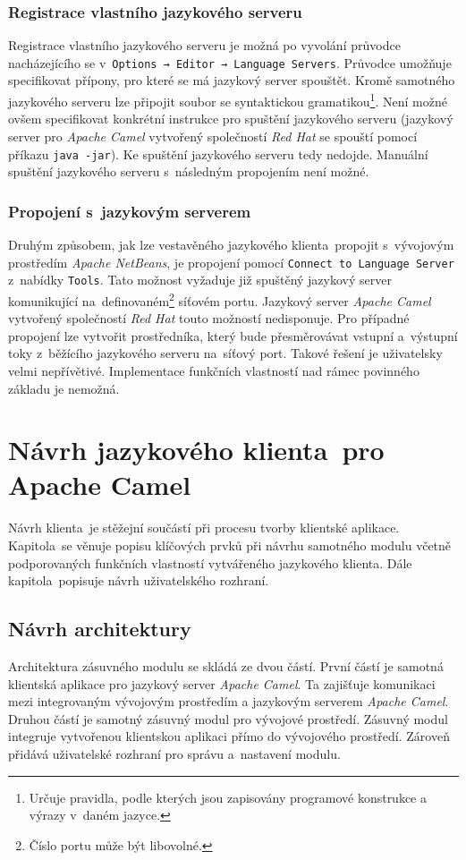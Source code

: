 \subsection{Registrace vlastního jazykového serveru}
Registrace vlastního jazykového serveru je možná po vyvolání průvodce nacházejícího se v~\texttt{Options → Editor → Language Servers}. Průvodce umožňuje specifikovat přípony, pro které se má jazykový server spouštět. Kromě samotného jazykového serveru lze připojit soubor se syntaktickou gramatikou\footnote{Určuje pravidla, podle kterých jsou zapisovány programové konstrukce a výrazy v~daném jazyce.}. Není možné ovšem specifikovat konkrétní instrukce pro spuštění jazykového serveru (jazykový server pro \emph{Apache Camel} vytvořený společností \emph{Red Hat} se spouští pomocí příkazu \texttt{java -jar}). Ke spuštění jazykového serveru tedy nedojde. Manuální spuštění jazykového serveru s~následným propojením není možné.

\subsection{Propojení s~jazykovým serverem}
Druhým způsobem, jak lze vestavěného jazykového klienta~propojit s~vývojovým prostředím \emph{Apache NetBeans}, je propojení pomocí \texttt{Connect to Language Server} z~nabídky \texttt{Tools}. Tato možnost vyžaduje již spuštěný jazykový server komunikující na~definovaném\footnote{Číslo portu může být libovolné.} síťovém portu. Jazykový server \emph{Apache Camel} vytvořený společností \emph{Red Hat} touto možností nedisponuje. Pro případné propojení lze vytvořit prostředníka, který bude přesměrovávat vstupní a~výstupní toky z~běžícího jazykového serveru na~síťový port. Takové řešení je uživatelsky velmi nepřívětivé. Implementace funkčních vlastností nad rámec povinného základu je nemožná. 

\chapter{Návrh jazykového klienta~pro Apache Camel}
\label{navrhJazykovehoKlienta}
Návrh klienta~je stěžejní součástí při procesu tvorby klientské aplikace. Kapitola~se věnuje popisu klíčových prvků při návrhu samotného modulu včetně podporovaných funkčních vlastností vytvářeného jazykového klienta. Dále kapitola~popisuje návrh uživatelského rozhraní. 

\section{Návrh architektury}
\label{navrhJazykovehoKlienta-navrhArchitektury}
Architektura zásuvného modulu se skládá ze dvou částí. První částí je samotná klientská aplikace pro jazykový server \emph{Apache Camel}. Ta zajišťuje komunikaci mezi integrovaným vývojovým prostředím a jazykovým serverem \emph{Apache Camel}. Druhou částí je samotný zásuvný modul pro vývojové prostředí. Zásuvný modul integruje vytvořenou klientskou aplikaci přímo do vývojového prostředí. Zároveň přidává uživatelské rozhraní pro správu a~nastavení modulu. 

